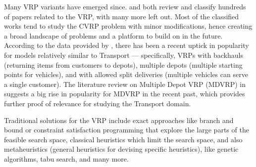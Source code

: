 Many VRP variants have emerged since. \citet{Eksioglu2009} and \citet{Braekers2016} both
review and classify hundreds of papers related to the VRP, with many more left out.
Most of the classified works tend to study the CVRP problem with minor modifications, hence creating
a broad landscape of problems and a platform to build on in the future.
According to the data provided by \citet[Table~4]{Braekers2016}, there has been a recent uptick
in popularity for models relatively similar to Transport --- specifically, VRPs with
backhauls (returning items from customers to depots),
multiple depots (multiple starting points for vehicles), and with allowed split deliveries (multiple
vehicles can serve a single customer).
The literature review on Multiple Depot VRP (MDVRP) in \citet{Montoya-Torres2015}
suggests a big rise in popularity for MDVRP in the recent past,
which provides further proof of relevance for studying the Transport domain.

Traditional solutions for the VRP include exact approaches like branch and bound
or constraint satisfaction
programming
that explore the large parts of the feasible search space,
classical heuristics which limit the search space, and also metaheuristics (general heuristics for devising specific heuristics), like genetic algorithms,  tabu search, and many more.

